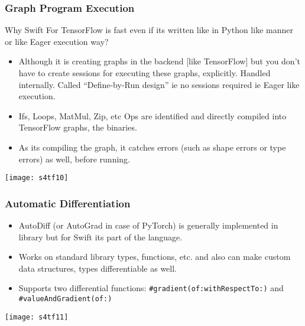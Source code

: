 \begin{frame}[fragile] \frametitle{Graph Program Execution}

Why Swift For TensorFlow is fast even if its written like in Python like manner or like Eager execution way?

\begin{itemize}
\item Although it is creating graphs in the backend [like TensorFlow] but you don’t have to create sessions for executing these graphs, explicitly. Handled internally. Called ``Define-by-Run design'' ie no sessions required ie Eager like execution.
\item Ifs, Loops, MatMul, Zip, etc Ops are identified and directly compiled into TensorFlow graphs, the binaries.
\item As its compiling the graph, it catches errors (such as shape errors or type errors) as well, before running.
\end{itemize}

\begin{center}
\texttt{[image: s4tf10]}
\end{center}
\end{frame}

\begin{frame}[fragile] \frametitle{Automatic Differentiation}

\begin{itemize}
\item AutoDiff (or AutoGrad in case of PyTorch) is generally implemented in library but for Swift its part of the language.
\item Works on standard library types, functions, etc. and also can make custom data structures, types differentiable as well.
\item Supports two differential functions: \lstinline|#gradient(of:withRespectTo:)| and \lstinline|#valueAndGradient(of:)|
\end{itemize}

\begin{center}
\texttt{[image: s4tf11]}
\end{center}
\end{frame}

